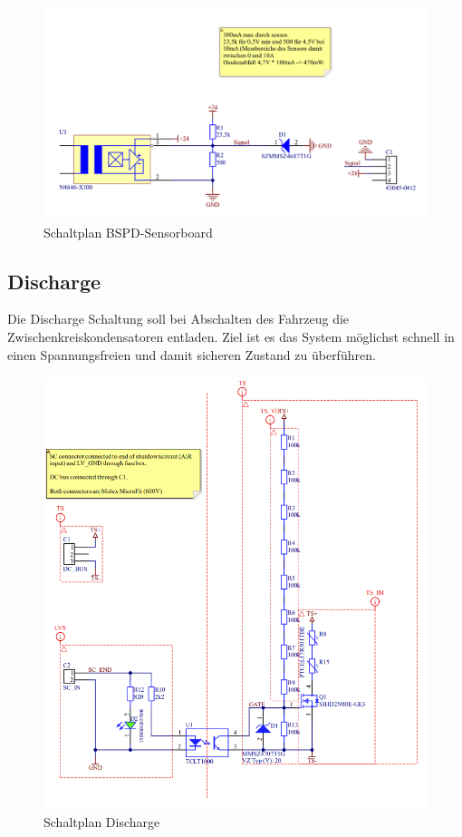 \begin{figure}
	\centering
	\includegraphics[width=0.7\linewidth]{"bilder/Sensorboard Schaltung"}
	\caption{Schaltplan \ac{BSPD}-Sensorboard}
	\label{fig:sensorboard-schaltung}
\end{figure}

\FloatBarrier
\subsection{Discharge}
Die Discharge Schaltung soll bei Abschalten des Fahrzeug die Zwischenkreiskondensatoren entladen. Ziel ist es das System möglichst schnell in einen Spannungsfreien und damit sicheren Zustand zu überführen.
\begin{figure}
	\centering
	\includegraphics[width=0.8\linewidth]{bilder/Discharge}
	\caption{Schaltplan Discharge}
	\label{fig:discharge}
\end{figure}


